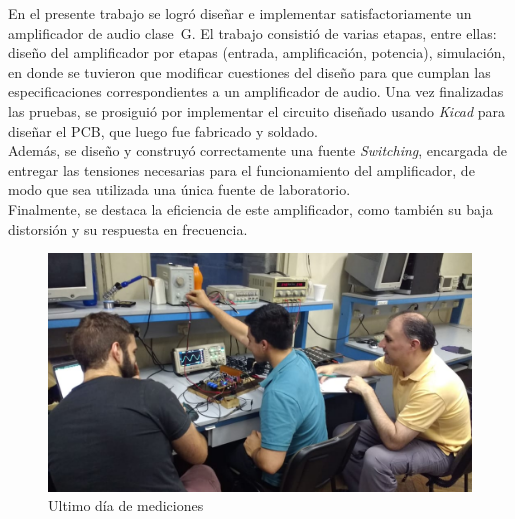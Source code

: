 

En el presente trabajo se logró diseñar e implementar satisfactoriamente un amplificador de audio clase~G. El trabajo consistió de varias etapas, entre ellas: diseño del amplificador por etapas (entrada, amplificación, potencia), simulación, en donde se tuvieron que modificar cuestiones del diseño para que cumplan las especificaciones correspondientes a un amplificador de audio. Una vez finalizadas las pruebas, se prosiguió por implementar el circuito diseñado usando \textit{Kicad} para diseñar el PCB, que luego fue fabricado y soldado.\\

Además, se diseño y construyó correctamente una fuente \textit{Switching}, encargada de entregar las tensiones necesarias para el funcionamiento del amplificador, de modo que sea utilizada una única fuente de laboratorio.\\


Finalmente, se destaca la eficiencia de este amplificador, como también su baja distorsión y su respuesta en frecuencia. 







\begin{figure}[H]
    \centering
    \includegraphics[scale=.4]{img/fotos/Dream_Team.jpeg}
    \caption{Ultimo día de mediciones}
    \label{fig:grupo_midiendo}
\end{figure}